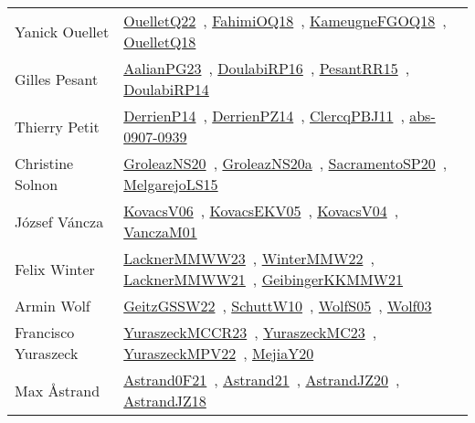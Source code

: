 {\begin{longtable}{p{4cm}p{20cm}}
Yanick Ouellet & \href{works/OuelletQ22.pdf}{OuelletQ22}~\cite{OuelletQ22}, \href{works/FahimiOQ18.pdf}{FahimiOQ18}~\cite{FahimiOQ18}, \href{works/KameugneFGOQ18.pdf}{KameugneFGOQ18}~\cite{KameugneFGOQ18}, \href{works/OuelletQ18.pdf}{OuelletQ18}~\cite{OuelletQ18}\\
Gilles Pesant & \href{works/AalianPG23.pdf}{AalianPG23}~\cite{AalianPG23}, \href{works/DoulabiRP16.pdf}{DoulabiRP16}~\cite{DoulabiRP16}, \href{works/PesantRR15.pdf}{PesantRR15}~\cite{PesantRR15}, \href{works/DoulabiRP14.pdf}{DoulabiRP14}~\cite{DoulabiRP14}\\
Thierry Petit & \href{works/DerrienP14.pdf}{DerrienP14}~\cite{DerrienP14}, \href{works/DerrienPZ14.pdf}{DerrienPZ14}~\cite{DerrienPZ14}, \href{works/ClercqPBJ11.pdf}{ClercqPBJ11}~\cite{ClercqPBJ11}, \href{works/abs-0907-0939.pdf}{abs-0907-0939}~\cite{abs-0907-0939}\\
Christine Solnon & \href{works/GroleazNS20.pdf}{GroleazNS20}~\cite{GroleazNS20}, \href{works/GroleazNS20a.pdf}{GroleazNS20a}~\cite{GroleazNS20a}, \href{works/SacramentoSP20.pdf}{SacramentoSP20}~\cite{SacramentoSP20}, \href{works/MelgarejoLS15.pdf}{MelgarejoLS15}~\cite{MelgarejoLS15}\\
J{\'{o}}zsef V{\'{a}}ncza & \href{works/KovacsV06.pdf}{KovacsV06}~\cite{KovacsV06}, \href{works/KovacsEKV05.pdf}{KovacsEKV05}~\cite{KovacsEKV05}, \href{works/KovacsV04.pdf}{KovacsV04}~\cite{KovacsV04}, \href{works/VanczaM01.pdf}{VanczaM01}~\cite{VanczaM01}\\
Felix Winter & \href{works/LacknerMMWW23.pdf}{LacknerMMWW23}~\cite{LacknerMMWW23}, \href{works/WinterMMW22.pdf}{WinterMMW22}~\cite{WinterMMW22}, \href{works/LacknerMMWW21.pdf}{LacknerMMWW21}~\cite{LacknerMMWW21}, \href{works/GeibingerKKMMW21.pdf}{GeibingerKKMMW21}~\cite{GeibingerKKMMW21}\\
Armin Wolf & \href{works/GeitzGSSW22.pdf}{GeitzGSSW22}~\cite{GeitzGSSW22}, \href{works/SchuttW10.pdf}{SchuttW10}~\cite{SchuttW10}, \href{works/WolfS05.pdf}{WolfS05}~\cite{WolfS05}, \href{works/Wolf03.pdf}{Wolf03}~\cite{Wolf03}\\
Francisco Yuraszeck & \href{works/YuraszeckMCCR23.pdf}{YuraszeckMCCR23}~\cite{YuraszeckMCCR23}, \href{works/YuraszeckMC23.pdf}{YuraszeckMC23}~\cite{YuraszeckMC23}, \href{works/YuraszeckMPV22.pdf}{YuraszeckMPV22}~\cite{YuraszeckMPV22}, \href{works/MejiaY20.pdf}{MejiaY20}~\cite{MejiaY20}\\
Max {\AA}strand & \href{works/Astrand0F21.pdf}{Astrand0F21}~\cite{Astrand0F21}, \href{}{Astrand21}~\cite{Astrand21}, \href{works/AstrandJZ20.pdf}{AstrandJZ20}~\cite{AstrandJZ20}, \href{works/AstrandJZ18.pdf}{AstrandJZ18}~\cite{AstrandJZ18}\\

\end{longtable}}
